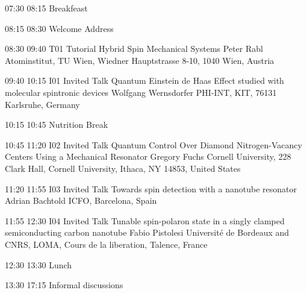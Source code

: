 \begin{confbreak}
{07:30}
{08:15}
{Breakfeast}
\end{confbreak}

\begin{confbreak}
{08:15}
{08:30}
{\ft Welcome Address}
\end{confbreak}

 

\begin{talk}
{08:30}
{09:40}
{T01}
{Tutorial}
{Hybrid Spin Mechanical Systems}
{Peter Rabl}
{Atominstitut, TU Wien, Wiedner Hauptstrasse 8-10, 1040 Wien, Austria}
\end{talk}

\begin{talk}
{09:40}
{10:15}
{I01}
{Invited Talk}
{Quantum Einstein de Haas Effect studied with molecular spintronic devices}
{Wolfgang Wernsdorfer}
{PHI-INT, KIT, 76131 Karlsruhe, Germany}
\end{talk}

\begin{confbreak}
{10:15}
{10:45}
{Nutrition Break}
\end{confbreak}

\begin{talk}
{10:45}
{11:20}
{I02}
{Invited Talk}
{Quantum Control Over Diamond Nitrogen-Vacancy Centers Using a Mechanical Resonator}
{Gregory Fuchs}
{Cornell University, 228 Clark Hall, Cornell University, Ithaca, NY 14853, United States}
\end{talk}

\begin{talk}
{11:20}
{11:55}
{I03}
{Invited Talk}
{Towards spin detection with a nanotube resonator}
{Adrian Bachtold}
{ICFO, Barcelona, Spain}
\end{talk}

\begin{talk}
{11:55}
{12:30}
{I04}
{Invited Talk}
{Tunable spin-polaron state in a singly clamped semiconducting carbon nanotube}
{Fabio Pistolesi}
{Université de Bordeaux and CNRS, LOMA, Cours de la liberation, Talence, France}
\end{talk}

\begin{confbreak}
{12:30}
{13:30}
{Lunch}
\end{confbreak}

\begin{confbreak}
{13:30}
{17:15}
{Informal discussions}
\end{confbreak}

